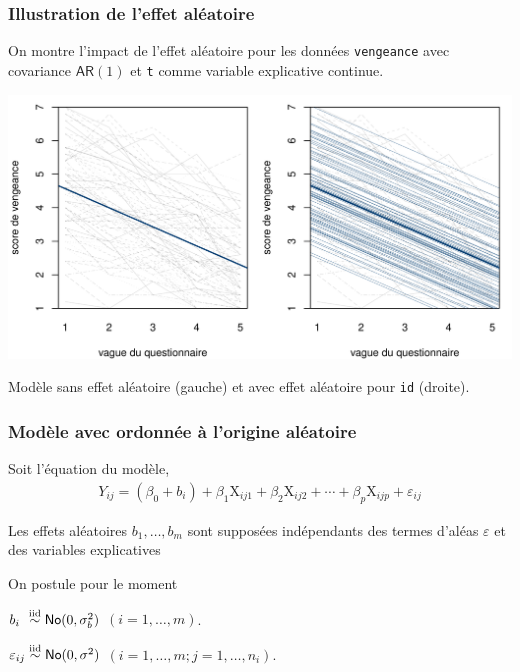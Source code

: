 \documentclass{beamer}
\begin{document}
\begin{frame}[fragile]
\frametitle{Illustration de l'effet aléatoire}
On montre l'impact de l'effet aléatoire pour les données \texttt{vengeance} avec covariance $\mathsf{AR}(1)$ et \texttt{t} comme variable explicative continue.

\begin{center}
\includegraphics[width = 0.8\linewidth]{img/c6/07-mixed-randomintercept_fr}
\end{center}
{
\footnotesize Modèle sans effet aléatoire (gauche) et avec effet aléatoire pour \texttt{id} (droite).

}
\end{frame}
\begin{frame}[fragile]
\frametitle{Modèle avec ordonnée à l'origine aléatoire}
Soit l'équation du modèle,
\begin{align*}
Y_{ij}=(\beta_0+b_i)+ \beta_1 \mathrm{X}_{ij1}+\beta_2\mathrm{X}_{ij2}+\cdots+\beta_p\mathrm{X}_{ijp} + \varepsilon_{ij}
\end{align*}
\bi
\item Les effets aléatoires $b_1, \ldots, b_m$ sont supposées indépendants des termes d'aléas $\varepsilon$ et des variables explicatives
\item On postule  pour le moment 
\bi \item $b_{i\phantom{j}}\stackrel{\textnormal{iid}}{\sim} \mathsf{No}(0, \sigma^2_b)$ $(i=1, \ldots, m)$.
\item $\varepsilon_{ij}\stackrel{\textnormal{iid}}{\sim} \mathsf{No}(0, \sigma^2)$ $(i=1, \ldots, m; j = 1, \ldots, n_i)$.
\ei
\ei
\end{frame}
\end{document}
